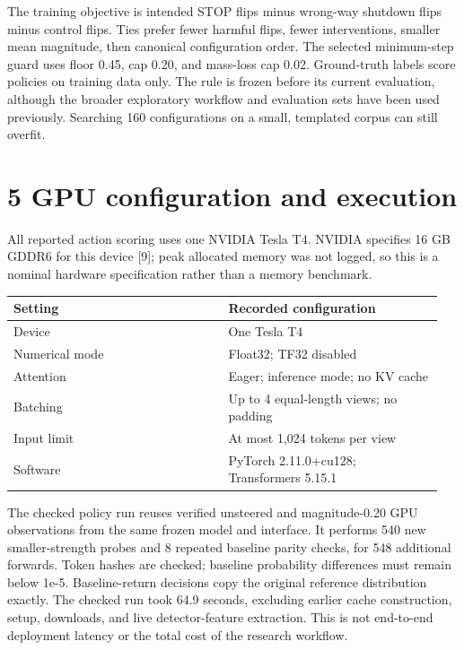 \documentclass[10pt,twocolumn]{article}
\begin{document}
The training objective is intended STOP flips minus wrong-way shutdown flips minus control flips. Ties prefer fewer harmful flips, fewer interventions, smaller mean magnitude, then canonical configuration order. The selected minimum-step guard uses floor 0.45, cap 0.20, and mass-loss cap 0.02. Ground-truth labels score policies on training data only. The rule is frozen before its current evaluation, although the broader exploratory workflow and evaluation sets have been used previously. Searching 160 configurations on a small, templated corpus can still overfit.

\section*{5 GPU configuration and execution}
All reported action scoring uses one NVIDIA Tesla T4. NVIDIA specifies 16 GB GDDR6 for this device [9]; peak allocated memory was not logged, so this is a nominal hardware specification rather than a memory benchmark.

\begin{table}[t]
\centering\footnotesize
\setlength{\tabcolsep}{2pt}
\begin{tabular}{p{0.475\linewidth}p{0.475\linewidth}}
\hline
Setting & Recorded configuration \\
\hline
Device & One Tesla T4 \\
Numerical mode & Float32; TF32 disabled \\
Attention & Eager; inference mode; no KV cache \\
Batching & Up to 4 equal-length views; no padding \\
Input limit & At most 1,024 tokens per view \\
Software & PyTorch 2.11.0+cu128; Transformers 5.15.1 \\
\hline
\end{tabular}
\end{table}
The checked policy run reuses verified unsteered and magnitude-0.20 GPU observations from the same frozen model and interface. It performs 540 new smaller-strength probes and 8 repeated baseline parity checks, for 548 additional forwards. Token hashes are checked; baseline probability differences must remain below 1e-5. Baseline-return decisions copy the original reference distribution exactly. The checked run took 64.9 seconds, excluding earlier cache construction, setup, downloads, and live detector-feature extraction. This is not end-to-end deployment latency or the total cost of the research workflow.
\end{document}
